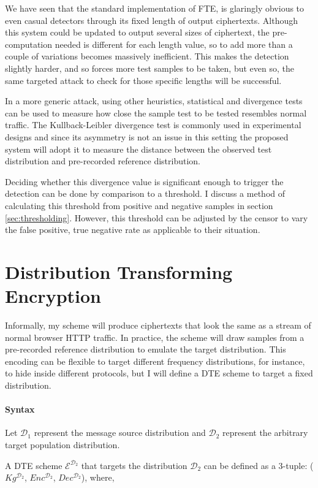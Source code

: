 \documentclass[ %
                    author={Samuel Russell},
                supervisor={Prof. Bogdan Warinschi},
                    degree={MEng},
                     title={Innocuous Ciphertexts},
                  subtitle={The DE-CENSOR Scheme},
                      type={Research},
                      year={2018} ]{dissertation}
\begin{document}
We have seen that the standard implementation of FTE, is glaringly obvious to even casual detectors through its fixed length of output ciphertexts.
Although this system could be updated to output several sizes of ciphertext, the pre-computation needed is different for each length value, so to add more than a couple of variations becomes massively inefficient.
This makes the detection slightly harder, and so forces more test samples to be taken, but even so, the same targeted attack to check for those specific lengths will be successful.

In a more generic attack, using other heuristics, statistical and divergence tests can be used to measure how close the sample test to be tested resembles normal traffic.
The Kullback-Leibler divergence test is commonly used in experimental designs and since its asymmetry is not an issue in this setting the proposed system will adopt it to measure the distance between the observed test distribution and pre-recorded reference distribution.

Deciding whether this divergence value is significant enough to trigger the detection can be done by comparison to a threshold.
I discuss a method of calculating this threshold from positive and negative samples in section \ref{sec:thresholding}. However, this threshold can be adjusted by the censor to vary the false positive, true negative rate as applicable to their situation.


\chapter{Distribution Transforming Encryption}

Informally, my scheme will produce ciphertexts that look the same as a stream of normal browser HTTP traffic.
In practice, the scheme will draw samples from a pre-recorded reference distribution to emulate the target distribution.
This encoding can be flexible to target different frequency distributions, for instance, to hide inside different protocols, but I will define a DTE scheme to target a fixed distribution.

\subsubsection{Syntax}
Let $\mathcal{D}_1$ represent the message source distribution and $\mathcal{D}_2$ represent the arbitrary target population distribution.


A DTE scheme $\mathcal{E}^{\mathcal{D}_2}$ that targets the distribution $\mathcal{D}_2$ can be defined as a 3-tuple: ($Kg^{\mathcal{D}_2}$, $Enc^{\mathcal{D}_2}$, $Dec^{\mathcal{D}_2}$), where,
\end{document}
